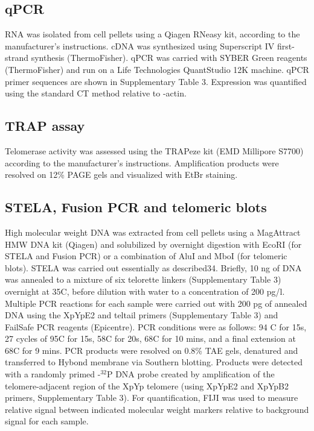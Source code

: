 \documentclass[phd,tocprelim]{cornell}
\begin{document}
\subsection*{qPCR}
RNA was isolated from cell pellets using a Qiagen RNeasy kit, according to the manufacturer’s instructions. cDNA was synthesized using Superscript IV first-strand synthesis (ThermoFisher). qPCR was carried with SYBER Green reagents (ThermoFisher) and run on a Life Technologies QuantStudio 12K machine. qPCR primer sequences are shown in Supplementary Table 3. Expression was quantified using the standard \textdelta \textdelta CT method relative to \textbeta-actin.

\subsection*{TRAP assay}
Telomerase activity was assessed using the TRAPeze kit (EMD Millipore S7700) according to the manufacturer’s instructions. Amplification products were resolved on 12\% PAGE gels and visualized with EtBr staining. 

\subsection*{STELA, Fusion PCR and telomeric blots}
High molecular weight DNA was extracted from cell pellets using a MagAttract HMW DNA kit (Qiagen) and solubilized by overnight digestion with EcoRI (for STELA and Fusion PCR) or a combination of AluI and MboI (for telomeric blots). STELA was carried out essentially as described34. Briefly, 10 ng of DNA was annealed to a mixture of  six telorette linkers (Supplementary Table 3) overnight at 35\textdegree C, before dilution with water to a concentration of 200 pg/\textmu l. Multiple PCR reactions for each sample were carried out with 200 pg of annealed DNA using the XpYpE2 and teltail primers (Supplementary Table 3) and FailSafe PCR reagents (Epicentre). PCR conditions were as follows: 94 \textdegree C for 15s, 27 cycles of 95\textdegree C for 15s, 58\textdegree C for 20s, 68\textdegree C for 10 mins, and a final extension at 68\textdegree C for 9 mins. PCR products were resolved on 0.8\% TAE gels, denatured and transferred to Hybond membrane via Southern blotting. Products were detected with a randomly primed \textalpha-$^{32}$P DNA probe created by amplification of the telomere-adjacent region of the XpYp telomere (using XpYpE2 and XpYpB2 primers, Supplementary Table 3). For quantification, FIJI was used to measure relative signal between indicated molecular weight markers relative to background signal for each sample. 
\end{document}

